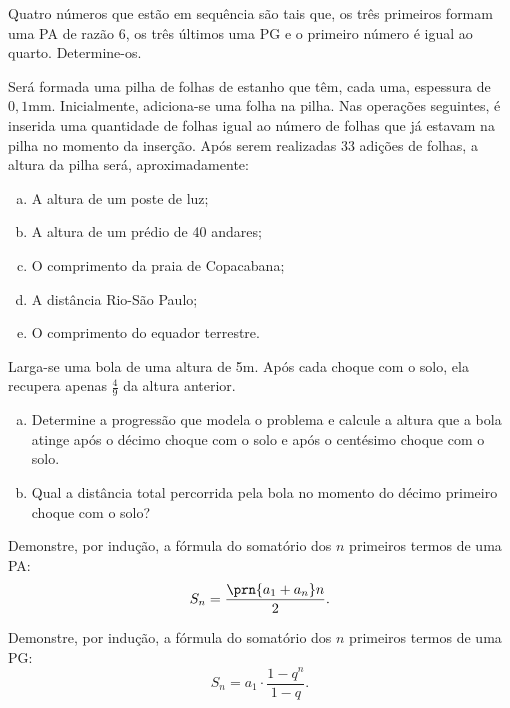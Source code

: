 \begin{exercise}
    Quatro números que estão em sequência são tais que, os três
primeiros formam uma PA de razão 6, os três últimos uma PG e o
primeiro número é igual ao quarto. Determine-os.
\end{exercise}

\begin{exercise}
Será formada uma pilha de folhas de estanho que têm, cada uma,
espessura de $0,1$mm. Inicialmente, adiciona-se uma folha na pilha.
Nas operações seguintes, é inserida uma quantidade de folhas igual
ao número de folhas que já estavam na pilha no momento da inserção.
Após serem realizadas 33 adições de folhas, a altura da pilha será,
aproximadamente:
\begin{enumerate}[a.]
  \item A altura de um poste de luz;
  \item A altura de um prédio de 40 andares;
  \item O comprimento da praia de Copacabana;
  \item A distância Rio-São Paulo;
  \item O comprimento do equador terrestre.
\end{enumerate}
\end{exercise}

\begin{exercise}
    Larga-se uma bola de uma altura de 5m. Após cada choque com o
solo, ela recupera apenas $\frac 4 9 $ da altura anterior. 
%
\begin{enumerate}[a.]
    \item Determine a progressão que modela o problema e calcule 
    a altura que a bola atinge após o décimo choque com o solo
    e após o centésimo choque com o solo.
    \item Qual a distância total percorrida pela bola no momento 
    do décimo primeiro choque com o solo? 
\end{enumerate}
\end{exercise}

\begin{exercise}
	Demonstre, por indução, a fórmula do somatório dos $n$ primeiros termos de uma PA:
	\[S_n = \frac {\prn {a_1+a_n}n} 2.\]
\end{exercise}

\begin{exercise}
	Demonstre, por indução, a fórmula do somatório dos $n$ primeiros termos de uma PG:
	\[S_n = a_1 \cdot \frac{1-q^n}{1-q}.\]
\end{exercise}

